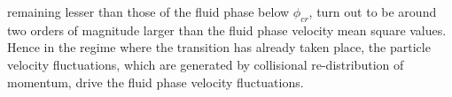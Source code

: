 remaining lesser than those of the fluid phase below $\phi_{cr}$, turn out to be around two orders of magnitude larger than the fluid phase velocity mean square values. Hence in the regime where the transition has already taken place, the particle velocity fluctuations, which are generated by collisional re-distribution of momentum, drive the fluid phase velocity fluctuations.


